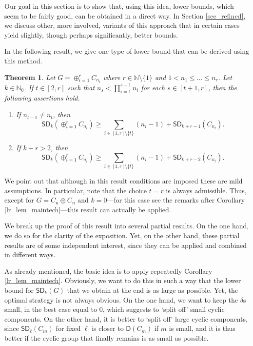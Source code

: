 \documentclass{amsart}
\newtheorem{thm}{Theorem}[section]
\theoremstyle{definition}
\numberwithin{equation}{section}
\begin{document}
Our goal in this section is to show that, using this idea, lower bounds, which seem to be fairly good, can be obtained in a direct way.
In Section \ref{sec_refined}, we discuss other, more involved, variants of this approach that in certain cases yield slightly, though perhaps significantly, better bounds.

In the following result, we give one type of lower bound that can be derived using this method.

\begin{thm}
\label{lr_thm_maintech}
Let $G = \oplus_{i=1}^r C_{n_i}$ where $r\in \mathbb{N}\setminus \{1\}$ and $1 < n_1 \le \dots \le n_r$. Let $k \in \mathbb{N}_0$.
If $t \in [2,r]$ such that $n_{s} < \prod_{i=1}^{s-1} n_i$ for each $s \in [t+1,r]$, then the following assertions hold.
\begin{enumerate}
\item If $n_{t-1}\neq n_t$, then
\[{\mathsf{SD}}_k(\oplus_{i=1}^{r}C_{n_i}) \ge \sum_{i\in [1,r]\setminus \{t\}} (n_i -1)+ {\mathsf{SD}}_{k+r-1}( C_{n_t}).\]
\item If $k+r >2$, then
\[{\mathsf{SD}}_k(\oplus_{i=1}^{r}C_{n_i}) \ge \sum_{i\in [1,r]\setminus \{t\}} (n_i -1)+ {\mathsf{SD}}_{k+r-2}( C_{n_t}).\]
\end{enumerate}
\end{thm}
We point out that although in this result conditions are imposed these are mild assumptions.
In particular, note that the choice $t=r$ is always admissible.
Thus, except for $G= C_n \oplus C_n$ and $k=0$---for this case see the remarks after Corollary \ref{lr_lem_maintech}---this result can actually be applied.

We break up the proof of this result into several partial results. On the one hand, we do so for the clarity of the exposition. Yet, on the other hand, these partial results are of some independent interest, since they can be applied and combined in different ways.

As already mentioned, the basic idea is to apply repeatedly Corollary \ref{lr_lem_maintech}.
Obviously, we want to do this in such a way that the lower bound for ${\mathsf{SD}}_k(G)$ that we obtain at the end is
as large as possible.
Yet, the optimal strategy is not always obvious.
On the one hand, we want to keep the $\delta$s small, in the best case equal to $0$, which suggests to `split off' small cyclic components.
On the other hand, it is better to `split off' large cyclic components, since
${\mathsf{SD}}_{\ell}(C_m)$ for fixed $\ell$ is closer to ${\mathsf{D}}(C_m)$ if $m$ is small, and it is thus better if the cyclic group that finally remains is as small as possible.
\end{document}

